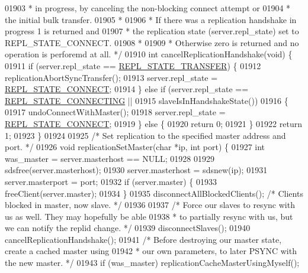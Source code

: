 \begin{DoxyCode}
{{{{{{{{{{{{{{{{{{{{{{{{{{{{{{{{{{{{{{{{{{{{{{{{{{{{{{{{{{{{{{{{{{{{{{{01903 \textcolor{comment}{ * in progress, by canceling the non-blocking connect attempt or}
01904 \textcolor{comment}{ * the initial bulk transfer.}
01905 \textcolor{comment}{ *}
01906 \textcolor{comment}{ * If there was a replication handshake in progress 1 is returned and}
01907 \textcolor{comment}{ * the replication state (server.repl\_state) set to REPL\_STATE\_CONNECT.}
01908 \textcolor{comment}{ *}
01909 \textcolor{comment}{ * Otherwise zero is returned and no operation is perforemd at all. */}
01910 \textcolor{keywordtype}{int} cancelReplicationHandshake(\textcolor{keywordtype}{void}) \{
01911     \textcolor{keywordflow}{if} (server.repl\_state == \hyperlink{server_8h_a1d27594a2d9c8d24e4ed5a2e88d1113e}{REPL\_STATE\_TRANSFER}) \{
01912         replicationAbortSyncTransfer();
01913         server.repl\_state = \hyperlink{server_8h_adfe013d4a620f0b98b47b2144760e69f}{REPL\_STATE\_CONNECT};
01914     \} \textcolor{keywordflow}{else} \textcolor{keywordflow}{if} (server.repl\_state == \hyperlink{server_8h_a5fd7ad86a4a65d6486d151151a59e9a5}{REPL\_STATE\_CONNECTING} ||
01915                slaveIsInHandshakeState())
01916     \{
01917         undoConnectWithMaster();
01918         server.repl\_state = \hyperlink{server_8h_adfe013d4a620f0b98b47b2144760e69f}{REPL\_STATE\_CONNECT};
01919     \} \textcolor{keywordflow}{else} \{
01920         \textcolor{keywordflow}{return} 0;
01921     \}
01922     \textcolor{keywordflow}{return} 1;
01923 \}
01924 
01925 \textcolor{comment}{/* Set replication to the specified master address and port. */}
01926 \textcolor{keywordtype}{void} replicationSetMaster(\textcolor{keywordtype}{char} *ip, \textcolor{keywordtype}{int} port) \{
01927     \textcolor{keywordtype}{int} was\_master = server.masterhost == NULL;
01928 
01929     sdsfree(server.masterhost);
01930     server.masterhost = sdsnew(ip);
01931     server.masterport = port;
01932     \textcolor{keywordflow}{if} (server.master) \{
01933         freeClient(server.master);
01934     \}
01935     disconnectAllBlockedClients(); \textcolor{comment}{/* Clients blocked in master, now slave. */}
01936 
01937     \textcolor{comment}{/* Force our slaves to resync with us as well. They may hopefully be able}
01938 \textcolor{comment}{     * to partially resync with us, but we can notify the replid change. */}
01939     disconnectSlaves();
01940     cancelReplicationHandshake();
01941     \textcolor{comment}{/* Before destroying our master state, create a cached master using}
01942 \textcolor{comment}{     * our own parameters, to later PSYNC with the new master. */}
01943     \textcolor{keywordflow}{if} (was\_master) replicationCacheMasterUsingMyself();
}}}}}}}}}}}}}}}}}}}}}}}}}}}}}}}}}}}}}}}}}}}}}}}}}}}}}}}}}}}}}}}}}}}}}}}
\end{DoxyCode}
